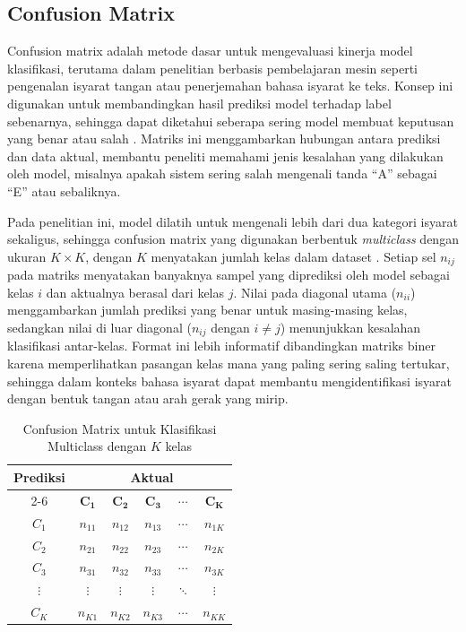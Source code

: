 \subsection{Confusion Matrix} \label{II.Teori5}
Confusion matrix adalah metode dasar untuk mengevaluasi kinerja model klasifikasi, terutama dalam penelitian berbasis pembelajaran mesin seperti pengenalan isyarat tangan atau penerjemahan bahasa isyarat ke teks. Konsep ini digunakan untuk membandingkan hasil prediksi model terhadap label sebenarnya, sehingga dapat diketahui seberapa sering model membuat keputusan yang benar atau salah \cite{Raschka2020}. Matriks ini menggambarkan hubungan antara prediksi dan data aktual, membantu peneliti memahami jenis kesalahan yang dilakukan oleh model, misalnya apakah sistem sering salah mengenali tanda ``A'' sebagai ``E'' atau sebaliknya.\par

Pada penelitian ini, model dilatih untuk mengenali lebih dari dua kategori isyarat sekaligus, sehingga confusion matrix yang digunakan berbentuk \textit{multiclass} dengan ukuran $K \times K$, dengan $K$ menyatakan jumlah kelas dalam dataset \cite{Raschka2020}. Setiap sel $n_{ij}$ pada matriks menyatakan banyaknya sampel yang diprediksi oleh model sebagai kelas $i$ dan aktualnya berasal dari kelas $j$. Nilai pada diagonal utama ($n_{ii}$) menggambarkan jumlah prediksi yang benar untuk masing-masing kelas, sedangkan nilai di luar diagonal ($n_{ij}$ dengan $i \neq j$) menunjukkan kesalahan klasifikasi antar-kelas. Format ini lebih informatif dibandingkan matriks biner karena memperlihatkan pasangan kelas mana yang paling sering saling tertukar, sehingga dalam konteks bahasa isyarat dapat membantu mengidentifikasi isyarat dengan bentuk tangan atau arah gerak yang mirip.\par

\begin{table}[H]
	\caption{Confusion Matrix untuk Klasifikasi Multiclass dengan $K$ kelas}
	\label{tab:confusion-matrix-multiclass}
\centering
\begingroup
\setlength{\tabcolsep}{8pt}
\renewcommand{\arraystretch}{1.4}
	\footnotesize
\begin{tabular}{|c|c|c|c|c|c|}
		\hline
		
		\multirow{2}{*}{\textbf{Prediksi}} & \multicolumn{5}{c|}{\textbf{Aktual}} \\ \cline{2-6}
		
		 & $\boldsymbol{C_1}$ & $\boldsymbol{C_2}$ & $\boldsymbol{C_3}$ & $\boldsymbol{\cdots}$ & $\boldsymbol{C_K}$ \\ \hline
		$C_1$ & $n_{11}$ & $n_{12}$ & $n_{13}$ & $\cdots$ & $n_{1K}$ \\ \hline
		$C_2$ & $n_{21}$ & $n_{22}$ & $n_{23}$ & $\cdots$ & $n_{2K}$ \\ \hline
		$C_3$ & $n_{31}$ & $n_{32}$ & $n_{33}$ & $\cdots$ & $n_{3K}$ \\ \hline
		$\vdots$ & $\vdots$ & $\vdots$ & $\vdots$ & $\ddots$ & $\vdots$ \\ \hline
		$C_K$ & $n_{K1}$ & $n_{K2}$ & $n_{K3}$ & $\cdots$ & $n_{KK}$ \\ \hline
	\end{tabular}
\endgroup
\end{table}


